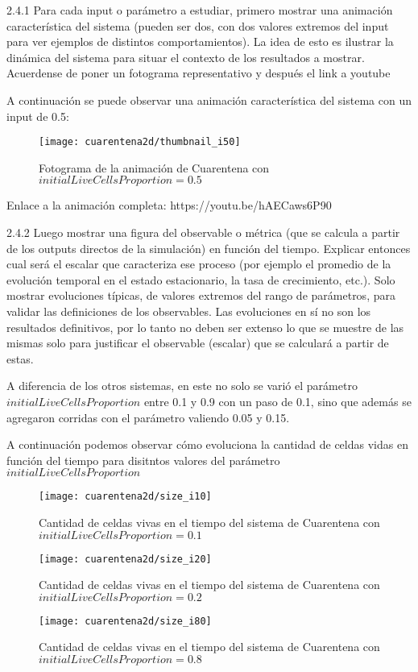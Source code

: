 2.4.1 Para cada input o parámetro a estudiar, primero mostrar una animación característica del 
sistema (pueden ser dos, con dos valores extremos del input para ver ejemplos de distintos 
comportamientos). La idea de esto es ilustrar la dinámica del sistema para situar el contexto de los 
resultados a mostrar. Acuerdense de poner un fotograma representativo y después el link a youtube 

A continuación se puede observar una animación característica del sistema con un input de 0.5:

\begin{figure}[H]
    \centering
    \texttt{[image: cuarentena2d/thumbnail\_i50]}
    \caption{Fotograma de la animación de Cuarentena con $initialLiveCellsProportion = 0.5$}
    \label{fig:thumbnailcuarentena2d_i50}
\end{figure}

Enlace a la animación completa: https://youtu.be/hAECaws6P90

2.4.2 Luego mostrar una figura del observable o métrica (que se calcula a partir de los outputs 
directos de la simulación) en función del tiempo. Explicar entonces cual será el escalar que 
caracteriza ese proceso (por ejemplo el promedio de la evolución temporal en el estado 
estacionario, la tasa de crecimiento, etc.). Solo mostrar evoluciones típicas, de valores extremos 
del rango de parámetros, para validar las definiciones de los observables. Las evoluciones en sí 
no son los resultados definitivos, por lo tanto no deben ser extenso lo que se muestre de las 
mismas solo para justificar el observable (escalar) que se calculará a partir de estas.

A diferencia de los otros sistemas, en este no solo se varió el parámetro $initialLiveCellsProportion$ entre 0.1 y 0.9 con un paso de 0.1, 
sino que además se agregaron corridas con el parámetro valiendo 0.05 y 0.15.

A continuación podemos observar cómo evoluciona la cantidad de celdas vidas en función del tiempo para disitntos valores del parámetro $initialLiveCellsProportion$

\begin{figure}[H]
    \centering
    \texttt{[image: cuarentena2d/size\_i10]}
    \caption{Cantidad de celdas vivas en el tiempo del sistema de Cuarentena con $initialLiveCellsProportion = 0.1$}
    \label{fig:cuarentena2d_i10}
\end{figure}
\begin{figure}[H]
    \centering
    \texttt{[image: cuarentena2d/size\_i20]}
    \caption{Cantidad de celdas vivas en el tiempo del sistema de Cuarentena con $initialLiveCellsProportion = 0.2$}
    \label{fig:cuarentena2d_i20}
\end{figure}
\begin{figure}[H]
    \centering
    \texttt{[image: cuarentena2d/size\_i80]}
    \caption{Cantidad de celdas vivas en el tiempo del sistema de Cuarentena con $initialLiveCellsProportion = 0.8$}
    \label{fig:cuarentena2d_i80}
\end{figure}

